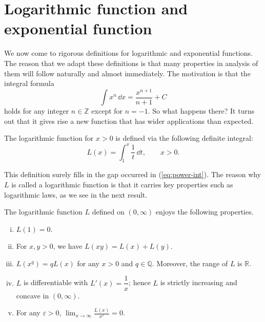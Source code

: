 \section{Logarithmic function and exponential function}
\label{sec:log-exp}

We now come to rigorous definitions for logarithmic and exponential functions.
The reason that we adapt these definitions is that many properties in analysis of them will follow naturally and almost immediately.
The motivation is that the integral formula
\begin{equation}
  \label{eq:power-int}
  \int x^n \, \dd x = \frac{x^{n+1}}{n+1} + C
\end{equation}
holds for any integer $n \in \mathbb{Z}$ except for $n = -1$.  So what happens there?
It turns out that it gives rise a new function that has wider applications than expected.

\begin{defn}
  The \textsf{logarithmic function} for $x > 0$ is defined via the following definite integral:
\[
  L(x) = \int_1^x \frac{1}{t} \, \dd t, \qquad x > 0.
\]
\end{defn}

This definition surely fills in the gap occurred in (\ref{eq:power-int}).
The reason why $L$ is called a logarithmic function is that it carries key properties such as logarithmic laws, as we see in the next result.

\begin{thm}
  The logarithmic function $L$ defined on $(0,\infty)$ enjoys the following properties.
  \begin{enumerate}[(i)]
    \item $L(1) = 0$.
    \item For $x, y > 0$, we have $L(xy) = L(x) + L(y)$.
    \item $L(x^q) = q L(x)$ for any $x > 0$ and $q \in \mathbb{Q}$.
      Moreover, the range of $L$ is $\mathbb{R}$.
    \item $L$ is differentiable with $L'(x) = \dfrac{1}{x}$; hence $L$ is strictly increasing and concave in $(0,\infty)$.
    \item For any $\varepsilon > 0$, $\displaystyle \lim_{x \to \infty} \frac{L(x)}{x^{\varepsilon}} = 0$.
  \end{enumerate}
\end{thm}

